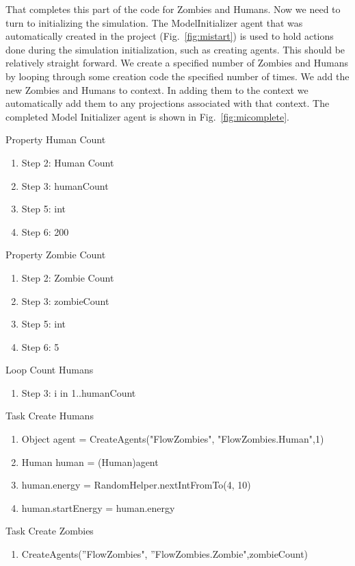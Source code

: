 \documentclass[11pt]{amsart}
\begin{document}
That completes this part of the code for Zombies and Humans. Now we need to turn to initializing the simulation.  The ModelInitializer agent that was automatically created in the project (Fig.~\ref{fig:mistart}) is used to hold actions done during the simulation initialization, such as creating agents.  This should be relatively straight forward. We create a specified number of Zombies and Humans by looping through some creation code the specified number of times. We add the new Zombies and Humans to context. In adding them to the context we automatically add them to any projections associated with that context.  The completed Model Initializer agent is shown in Fig.~\ref{fig:micomplete}.

Property Human Count
\begin{enumerate}
 \item Step 2: Human Count
 \item Step 3: humanCount 
 \item Step 5: int
 \item Step 6: 200
\end{enumerate}
 
Property Zombie Count
\begin{enumerate}
 \item Step 2: Zombie Count
 \item Step 3: zombieCount 
 \item Step 5: int
 \item Step 6: 5
\end{enumerate}

Loop Count Humans
\begin{enumerate} 
 \item Step 3: i in 1..humanCount
\end{enumerate}

Task Create Humans
\begin{enumerate}
 \item Object agent = CreateAgents("FlowZombies", "FlowZombies.Human",1)
 \item Human human = (Human)agent
 \item  human.energy = RandomHelper.nextIntFromTo(4, 10)
 \item  human.startEnergy = human.energy
\end{enumerate}

Task Create Zombies
\begin{enumerate}
 \item CreateAgents(''FlowZombies", ''FlowZombies.Zombie",zombieCount)
\end{enumerate}
\end{document}
